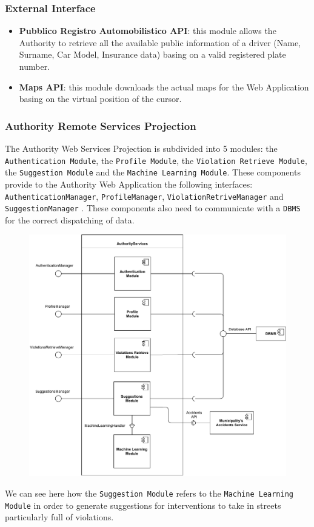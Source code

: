 \documentclass[12pt,a4paper]{article}
\begin{document}
\subsubsection*{External Interface}
\begin{itemize}
\item \textbf{Pubblico Registro Automobilistico API}: this module allows the Authority to retrieve all the available public information of a driver (Name, Surname, Car Model, Insurance data) basing on a valid registered plate number.
\item \textbf{Maps API}: this module downloads the actual maps for the Web Application basing on the virtual position of the cursor.
\end{itemize}
\newpage
\subsubsection{Authority Remote Services Projection}
The Authority Web Services Projection is subdivided into 5 modules: the \texttt{Authentication Module}, the \texttt{Profile Module}, the \texttt{Violation Retrieve Module}, the \texttt{Suggestion Module} and the \texttt{Machine Learning Module}. These components provide to the Authority Web Application the following interfaces: \texttt{AuthenticationManager}, \texttt{ProfileManager}, \texttt{ViolationRetriveManager} and \texttt{SuggestionManager} . These components also need to communicate with a \texttt{DBMS} for the correct dispatching of data.
\begin{figure}[H]
		\centering
		\includegraphics[width=1.2\linewidth]{../assets/images/authority_projection.pdf}
	\end{figure}
We can see here how the \texttt{Suggestion Module} refers to the \texttt{Machine Learning Module} in order to generate suggestions for interventions to take in streets particularly full of violations.
\end{document}
